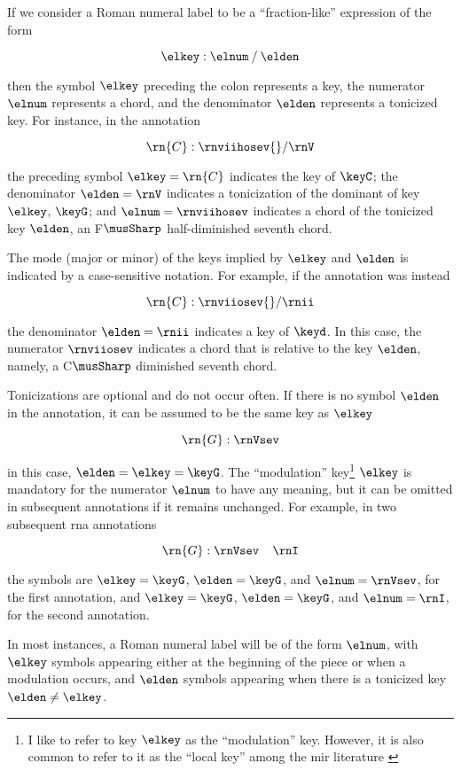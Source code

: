 
If we consider a Roman numeral label to be a
``fraction-like'' expression of the form

\begin{equation}
    \elkey : \elnum \: / \: \elden
\end{equation}

then the symbol $\elkey$ preceding the colon represents a
key, the numerator $\elnum$ represents a chord, and the
denominator $\elden$ represents a tonicized key. For
instance, in the annotation 

\begin{equation}
    \rn{C}:\rnviihosev{}/\rnV
\end{equation}

the preceding symbol $\elkey=\rn{C}$ indicates the key of
$\keyC$; the denominator $\elden = \rnV$ indicates a
tonicization of the dominant of key $\elkey$, $\keyG$; and
$\elnum=\rnviihosev$ indicates a chord of the tonicized key
$\elden$, an F$\musSharp$ half-diminished seventh chord.

The mode (major or minor) of the keys implied by $\elkey$
and $\elden$ is indicated by a case-sensitive notation. For
example, if the annotation was instead

\begin{equation}
    \rn{C}:\rnviiosev{}/\rnii
\end{equation}

the denominator $\elden=\rnii$ indicates a key of $\keyd$.
In this case, the numerator $\rnviiosev$ indicates a chord
that is relative to the key $\elden$, namely, a C$\musSharp$
diminished seventh chord.

Tonicizations are optional and do not occur often. If there
is no symbol $\elden$ in the annotation, it can be assumed
to be the same key as $\elkey$

\begin{equation}
    \rn{G}:\rnVsev
\end{equation}

in this case, $\elden = \elkey = \keyG$. The ``modulation''
key\footnote{I like to refer to key $\elkey$ as the
``modulation'' key. However, it is also common to refer to
it as the ``local key'' among the \gls{mir} literature
\parencite{napoleslopez2020local}} $\elkey$ is mandatory for
the numerator $\elnum$ to have any meaning, but it can be
omitted in subsequent annotations if it remains unchanged.
For example, in two subsequent \gls{rna} annotations

\begin{equation}
    \rn{G}:\rnVsev \;\;\;\; \rnI
\end{equation}

the symbols are $\elkey=\keyG$, $\elden=\keyG$, and
$\elnum=\rnVsev$, for the first annotation, and
$\elkey=\keyG$, $\elden=\keyG$, and $\elnum=\rnI$, for the
second annotation.

In most instances, a Roman numeral label will be of the form
$\elnum$, with $\elkey$ symbols appearing either at the
beginning of the piece or when a modulation occurs, and
$\elden$ symbols appearing when there is a tonicized key
$\elden \neq \elkey$.
